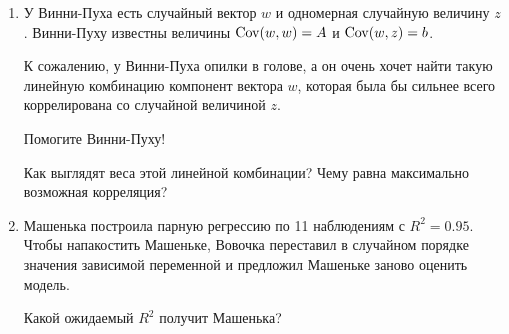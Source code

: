 \begin{enumerate}
   \item У Винни-Пуха есть случайный вектор $w$ и одномерная случайную величину $z$.
   Винни-Пуху известны величины $\operatorname{Cov}(w, w) = A$ и $\operatorname{Cov}(w, z) = b$.

   К сожалению, у Винни-Пуха опилки в голове, а он очень хочет найти такую линейную комбинацию
   компонент вектора $w$, которая была бы сильнее всего коррелирована со случайной
   величиной $z$.

   Помогите Винни-Пуху!

   Как выглядят веса этой линейной комбинации?
   Чему равна максимально возможная корреляция?

 \item Машенька построила парную регрессию по 11 наблюдениям с $R^2=
0.95$. Чтобы напакостить Машеньке, Вовочка переставил в случайном
порядке значения зависимой переменной и предложил Машеньке заново оценить модель.

Какой ожидаемый $R^2$ получит Машенька?
\end{enumerate}


